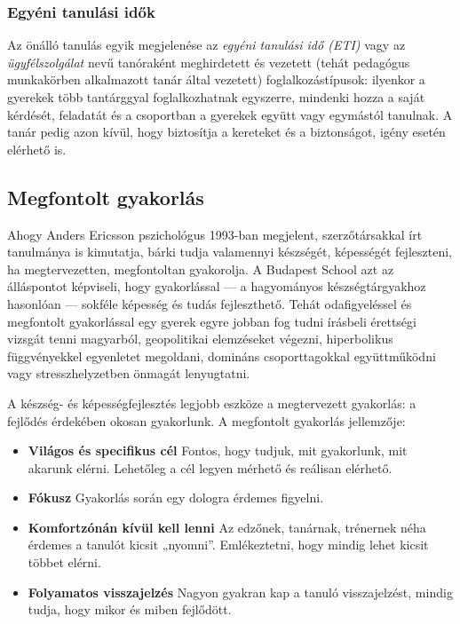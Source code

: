 \hypertarget{egyeni-tanulasi-idok}{%
\subsubsection{Egyéni tanulási idők}\label{egyeni-tanulasi-idok}}

Az önálló tanulás egyik megjelenése az \emph{egyéni tanulási idő (ETI)}
vagy az \emph{ügyfélszolgálat} nevű tanóraként meghirdetett és vezetett
(tehát pedagógus munkakörben alkalmazott tanár által vezetett)
foglalkozástípusok: ilyenkor a gyerekek több tantárggyal
foglalkozhatnak egyszerre, mindenki hozza a saját kérdését, feladatát és
a csoportban a gyerekek együtt vagy egymástól tanulnak. A tanár pedig
azon kívül, hogy biztosítja a kereteket és a biztonságot, igény esetén
elérhető is.

\hypertarget{megfontolt-gyakorlas}{%
\subsection{Megfontolt gyakorlás}\label{megfontolt-gyakorlas}}

Ahogy Anders Ericsson pszichológus
1993-ban
megjelent, szerzőtársakkal írt tanulmánya {\autocite{ericsson:etal:1993}} is kimutatja, bárki tudja valamennyi készségét,
képességét fejleszteni, ha megtervezetten, megfontoltan gyakorolja. A
Budapest School azt az álláspontot képviseli, hogy gyakorlással --- a
hagyományos készségtárgyakhoz hasonlóan --- sokféle képesség és tudás
fejleszthető. Tehát odafigyeléssel és megfontolt gyakorlással egy gyerek
egyre jobban fog tudni írásbeli érettségi vizsgát tenni magyarból,
geopolitikai elemzéseket végezni, hiperbolikus függvényekkel egyenletet
megoldani, domináns csoporttagokkal együttműködni vagy
stresszhelyzetben
önmagát lenyugtatni.

A készség- és képességfejlesztés legjobb eszköze a megtervezett
gyakorlás: a fejlődés érdekében okosan gyakorlunk. A megfontolt
gyakorlás jellemzője:

\begin{itemize}
\item
  \textbf{Világos és specifikus cél} Fontos, hogy tudjuk, mit
  gyakorlunk, mit akarunk elérni. Lehetőleg a cél legyen mérhető és
  reálisan elérhető.
\item
  \textbf{Fókusz} Gyakorlás során egy dologra érdemes figyelni.
\item
  \textbf{Komfortzónán kívül kell lenni} Az edzőnek, tanárnak, trénernek
  néha érdemes a tanulót kicsit „nyomni''. Emlékeztetni, hogy mindig
  lehet kicsit többet elérni.
\item
  \textbf{Folyamatos visszajelzés} Nagyon gyakran kap a tanuló
  visszajelzést, mindig tudja, hogy mikor és miben fejlődött.
\end{itemize}
